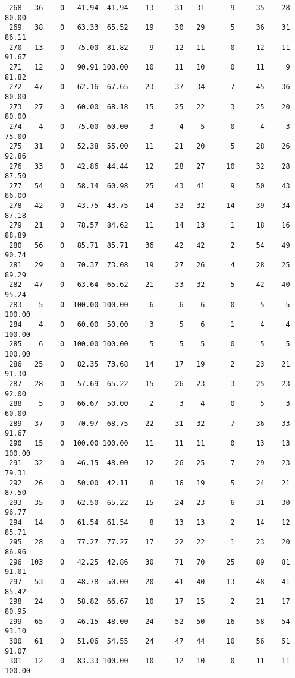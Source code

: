\begin{verbatim}
 268   36    0   41.94  41.94    13     31   31      9     35    28    80.00
 269   38    0   63.33  65.52    19     30   29      5     36    31    86.11
 270   13    0   75.00  81.82     9     12   11      0     12    11    91.67
 271   12    0   90.91 100.00    10     11   10      0     11     9    81.82
 272   47    0   62.16  67.65    23     37   34      7     45    36    80.00
 273   27    0   60.00  68.18    15     25   22      3     25    20    80.00
 274    4    0   75.00  60.00     3      4    5      0      4     3    75.00
 275   31    0   52.38  55.00    11     21   20      5     28    26    92.86
 276   33    0   42.86  44.44    12     28   27     10     32    28    87.50
 277   54    0   58.14  60.98    25     43   41      9     50    43    86.00
 278   42    0   43.75  43.75    14     32   32     14     39    34    87.18
 279   21    0   78.57  84.62    11     14   13      1     18    16    88.89
 280   56    0   85.71  85.71    36     42   42      2     54    49    90.74
 281   29    0   70.37  73.08    19     27   26      4     28    25    89.29
 282   47    0   63.64  65.62    21     33   32      5     42    40    95.24
 283    5    0  100.00 100.00     6      6    6      0      5     5   100.00
 284    4    0   60.00  50.00     3      5    6      1      4     4   100.00
 285    6    0  100.00 100.00     5      5    5      0      5     5   100.00
 286   25    0   82.35  73.68    14     17   19      2     23    21    91.30
 287   28    0   57.69  65.22    15     26   23      3     25    23    92.00
 288    5    0   66.67  50.00     2      3    4      0      5     3    60.00
 289   37    0   70.97  68.75    22     31   32      7     36    33    91.67
 290   15    0  100.00 100.00    11     11   11      0     13    13   100.00
 291   32    0   46.15  48.00    12     26   25      7     29    23    79.31
 292   26    0   50.00  42.11     8     16   19      5     24    21    87.50
 293   35    0   62.50  65.22    15     24   23      6     31    30    96.77
 294   14    0   61.54  61.54     8     13   13      2     14    12    85.71
 295   28    0   77.27  77.27    17     22   22      1     23    20    86.96
 296  103    0   42.25  42.86    30     71   70     25     89    81    91.01
 297   53    0   48.78  50.00    20     41   40     13     48    41    85.42
 298   24    0   58.82  66.67    10     17   15      2     21    17    80.95
 299   65    0   46.15  48.00    24     52   50     16     58    54    93.10
 300   61    0   51.06  54.55    24     47   44     10     56    51    91.07
 301   12    0   83.33 100.00    10     12   10      0     11    11   100.00

\end{verbatim}

